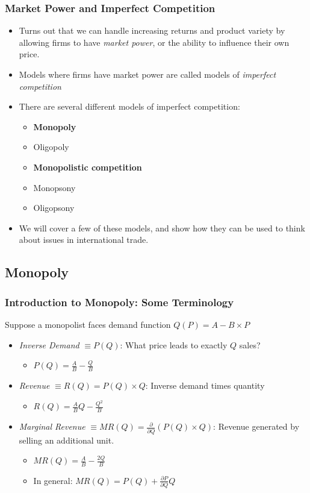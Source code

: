 \documentclass{beamer}
\begin{document}
\begin{frame}
	\frametitle{Market Power and Imperfect Competition}
	\begin{itemize}
		\item Turns out that we can handle increasing returns and product variety by allowing firms to have \emph{market power}, or the ability to influence their own price.
		\item Models where firms have market power are called models of \emph{imperfect competition}
		\item There are several different models of imperfect competition:
		\begin{itemize}
			\item \textbf{Monopoly}\\
			\item Oligopoly\\
			\item \textbf{Monopolistic competition}\\
			\item Monopsony\\
			\item Oligopsony\\
		\end{itemize}
		 \item We will cover a few of these models, and show how they can be used to think about issues in international trade.
	\end{itemize}
\end{frame}


\subsection{Monopoly}

\begin{frame}
\frametitle{Introduction to Monopoly: Some Terminology}
Suppose a monopolist faces demand function  $Q(P)=A-B\times P$
\begin{itemize}
	\item \emph{Inverse Demand} $\equiv P(Q)$: What price leads to exactly $Q$ sales?
		\begin{itemize}
			\item $P(Q) =\frac{A}{B}-\frac{Q}{B}$
		\end{itemize}
	\item \emph{Revenue} $\equiv R(Q) = P(Q)\times Q$: Inverse demand times quantity
		\begin{itemize}
			\item $R(Q)=\frac{A}{B} Q-\frac{Q^2}{B}$
		\end{itemize}
	\item \emph{Marginal Revenue} $\equiv MR(Q)=\frac{\partial}{\partial Q}\left(P(Q)\times Q\right)$: Revenue generated by selling an additional unit.
		\begin{itemize}
			\item $MR(Q)=\frac{A}{B}-\frac{2Q}{B}$
			\item In general: $MR(Q)=P(Q) + \frac{\partial P}{\partial Q}Q$
		\end{itemize}
\end{itemize}

\end{frame}
\end{document}
